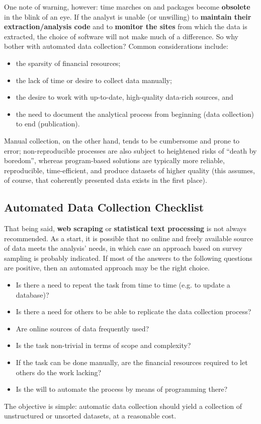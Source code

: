One note of warning, however: time marches on and packages become \textbf{obsolete} in the blink of an eye. If the analyst is unable (or unwilling) to \textbf{maintain their extraction/analysis code} and to \textbf{monitor the sites} from which the data is extracted, the choice of software will not make much of a difference. 
\newpage\noindent
So why bother with automated data collection? Common considerations include:
\begin{itemize}[noitemsep]
    \item the sparsity of financial resources;
\item the lack of time or desire to collect data manually;
\item the desire to work with up-to-date, high-quality data-rich sources, and
\item the need to document the analytical process from beginning (data collection) to end (publication).
\end{itemize} 
Manual collection, on the other hand, tends to be cumbersome and prone to error; non-reprodu\-ci\-ble processes are also subject to heightened risks of ``death by boredom'', whereas program-based solutions are typically more reliable, reproducible, time-efficient, and produce datasets of higher quality (this assumes, of course, that coherently presented data exists in the first place).  
\subsection{Automated Data Collection Checklist} That being said, \textbf{web scraping} or \textbf{statistical text processing} is not always recommended. As a start, it is possible that no online and freely available source of data meets the analysis' needs, in which case an approach based on survey sampling is probably indicated. \newl If most of the answers to the following questions are positive, then an automated approach may be the right choice.
\begin{itemize}[noitemsep]
\item Is there a need to repeat the task from time to time (e.g. to update a database)?
\item Is there a need for others to be able to replicate the data collection process?
\item Are online sources of data frequently used?
\item Is the task non-trivial in terms of scope and complexity?
\item If the task can be done manually, are the financial resources required to let others do the work lacking?
\item Is the will to automate the process by means of programming there?
\end{itemize}
The objective is simple: automatic data collection should yield a collection of unstructured or unsorted datasets, at a reasonable cost. 
